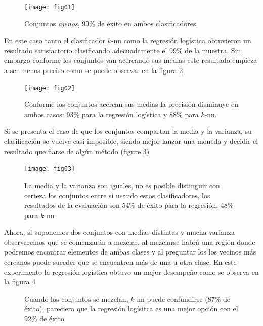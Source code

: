 \documentclass[11pt,letterpaper,reqno]{article}
\begin{document}
\begin{figure}[h]
	\begin{center}
		\texttt{[image: fig01]}
	\end{center}
	\caption{Conjuntos \textit{ajenos}, 99\% de éxito en ambos clasificadores.}
	\label{fig:fig01}
\end{figure}

En este caso tanto el clasificador $k$-nn como la regresión logística obtuvieron un resultado satisfactorio clasificando adecuadamente el 99\% de la muestra. Sin embargo conforme los conjuntos van acercando sus medias este resultado empieza a ser menos preciso como se puede observar en la figura \ref{fig:fig02}

\begin{figure}[h]
	\begin{center}
		\texttt{[image: fig02]}
	\end{center}
	\caption{Conforme los conjuntos acercan sus medias la precisión disminuye en ambos casos: 93\% para la regresión logística y 88\% para $k$-nn.}
	\label{fig:fig02}
\end{figure}

Si se presenta el caso de que los conjuntos compartan la media y la varianza, su clasificación se vuelve casi imposible, siendo mejor lanzar una moneda y decidir el resultado que fiarse de algún método (figure \ref{fig:fig03})

\begin{figure}[h]
	\begin{center}
		\texttt{[image: fig03]}
	\end{center}
	\caption{La media y la varianza son iguales, no es posible distinguir con certeza los conjuntos entre sí usando estos clasificadores, los resultados de la evaluación son 54\% de éxito para la regresión, 48\% para $k$-nn}
	\label{fig:fig03}
\end{figure}

Ahora, si suponemos dos conjuntos con medias distintas y mucha varianza observaremos que se comenzarán a mezclar, al mezclarse habrá una región donde podremos encontrar elementos de ambas clases y al preguntar los los vecinos más cercanos puede suceder que se encuentren más de una u otra clase. En este experimento la regresión logística obtuvo un mejor desempeño como se observa en la figura \ref{fig:fig04}

\begin{figure}[h]
	\begin{center}
	\end{center}
	\caption{Cuando los conjuntos se mezclan, $k$-nn puede confundirse (87\% de éxito), pareciera que la regresión logísitca es una mejor opción con el 92\% de éxito}
	\label{fig:fig04}
\end{figure}
\end{document}
